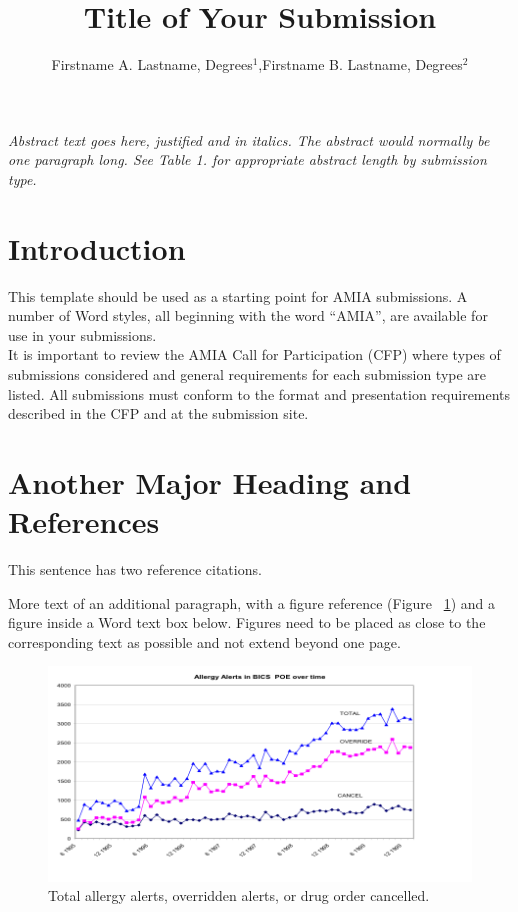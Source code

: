 \documentclass{amia}
\begin{document}
\title{Title of Your Submission}

\author{Firstname A. Lastname, Degrees$^{1}$,Firstname B. Lastname, Degrees$^{2}$}


\maketitle


\textit{Abstract text goes here, justified and in italics.  The abstract would normally be one paragraph long.  See Table 1. for appropriate abstract length by submission type.}

\section*{Introduction}
This template should be used as a starting point for AMIA submissions.  A number of Word styles, all beginning with the word “AMIA”, are available for use in your submissions.\\
It is important to review the AMIA Call for Participation (CFP) where types of submissions considered and general requirements for each submission type are listed. All submissions must conform to the format and presentation requirements described in the CFP and at the submission site.


\section*{Another Major Heading and References}
This sentence has two reference citations\cite{ref1,ref2}.

More text of an additional paragraph, with a figure reference (Figure ~\ref{fig1}) and a figure inside a Word text box below.  Figures need to be placed as close to the corresponding text as possible and not extend beyond one page.\\
\begin{figure}[h!]
\centering
\includegraphics[scale=1]{pics/figure1.png}
\caption{Total allergy alerts, overridden alerts, or drug order cancelled.}
\label{fig1}
\end{figure}
\end{document}
